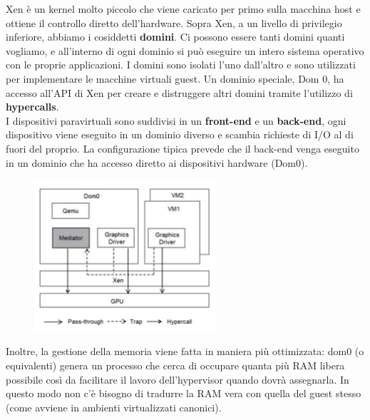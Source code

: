\documentclass{article}
\begin{document}
		Xen è un kernel molto piccolo che viene	caricato per primo sulla macchina host e ottiene il controllo diretto dell'hardware. Sopra Xen, a un livello di privilegio inferiore, abbiamo i cosiddetti \textbf{domini}. Ci possono essere tanti domini quanti vogliamo, e all'interno di ogni dominio si può eseguire un intero sistema operativo con le proprie applicazioni. I domini sono isolati l'uno dall'altro e sono utilizzati per implementare le macchine virtuali guest. Un dominio speciale, Dom 0, ha accesso all'API di Xen per creare e distruggere altri domini tramite l'utilizzo di \textbf{hypercalls}.\\
		
		I dispositivi paravirtuali sono suddivisi in un \textbf{front-end} e un \textbf{back-end}, ogni dispositivo viene eseguito in un dominio diverso e scambia richieste di I/O al di fuori del proprio. La configurazione tipica prevede che il back-end venga eseguito in un dominio che ha accesso diretto ai dispositivi hardware (Dom0).
		
		\begin{figure}[ht]
			\centering
			\includegraphics[width=0.6\textwidth]{SAC_B1_virtualizationIO_PCI.png} %
		\end{figure}
		
		Inoltre, la gestione della memoria viene fatta in maniera più ottimizzata: dom0 (o equivalenti) genera un processo che cerca di occupare quanta più RAM libera possibile così da facilitare il lavoro dell'hypervisor quando dovrà assegnarla. In questo modo non c’è bisogno di tradurre la RAM vera con quella del guest stesso (come avviene in	ambienti virtualizzati canonici).
		
\end{document}
